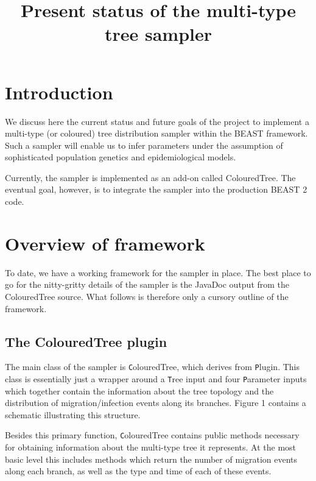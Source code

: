 \documentclass[english]{article}
\newcommand{\class}[1]{{\texttt #1}}
\newcommand{\package}[1]{{\textsf #1}}
\begin{document}
\title{Present status of the multi-type tree sampler}

\maketitle

\section{Introduction}

We discuss here the current status and future goals of the project
to implement a multi-type (or coloured) tree distribution sampler
within the BEAST framework. Such a sampler will enable us to infer
parameters under the assumption of sophisticated population genetics
and epidemiological models.

Currently, the sampler is implemented as an add-on called
\package{ColouredTree}. The eventual goal, however, is to integrate the
sampler into the production BEAST 2 code.


\section{Overview of framework}

To date, we have a working framework for the sampler in place.  The
best place to go for the nitty-gritty details of the sampler is the
JavaDoc output from the ColouredTree source.  What follows is
therefore only a cursory outline of the framework.


\subsection{The ColouredTree plugin}

The main class of the sampler is \class{ColouredTree}, which derives
from \class{Plugin}. This class is essentially just a wrapper around
a \class{Tree} input and four \class{Parameter} inputs which together
contain the information about the tree topology and the distribution
of migration/infection events along its branches.  Figure 1 contains a
schematic illustrating this structure.

Besides this primary function, \class{ColouredTree} contains public
methods necessary for obtaining information about the multi-type tree
it represents.  At the most basic level this includes methods which
return the number of migration events along each branch, as well as
the type and time of each of these events.
\end{document}
